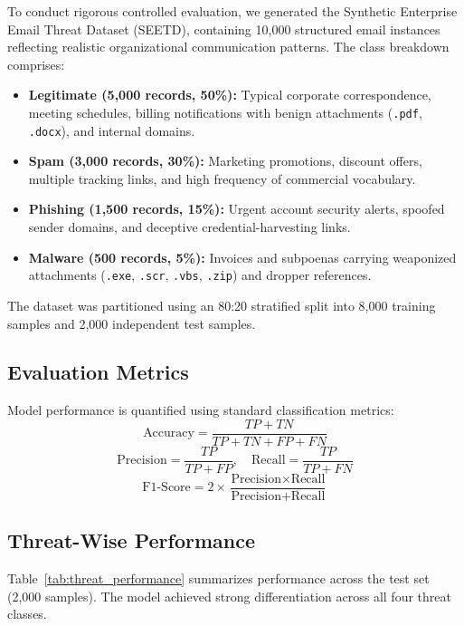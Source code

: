 \documentclass[conference]{IEEEtran}
\begin{document}
To conduct rigorous controlled evaluation, we generated the Synthetic Enterprise Email Threat Dataset (SEETD), containing 10,000 structured email instances reflecting realistic organizational communication patterns. The class breakdown comprises:
\begin{itemize}
    \item \textbf{Legitimate (5,000 records, 50\%):} Typical corporate correspondence, meeting schedules, billing notifications with benign attachments (\texttt{.pdf}, \texttt{.docx}), and internal domains.
    \item \textbf{Spam (3,000 records, 30\%):} Marketing promotions, discount offers, multiple tracking links, and high frequency of commercial vocabulary.
    \item \textbf{Phishing (1,500 records, 15\%):} Urgent account security alerts, spoofed sender domains, and deceptive credential-harvesting links.
    \item \textbf{Malware (500 records, 5\%):} Invoices and subpoenas carrying weaponized attachments (\texttt{.exe}, \texttt{.scr}, \texttt{.vbs}, \texttt{.zip}) and dropper references.
\end{itemize}

The dataset was partitioned using an 80:20 stratified split into 8,000 training samples and 2,000 independent test samples.

\subsection{Evaluation Metrics}
Model performance is quantified using standard classification metrics:
\begin{equation}
    \text{Accuracy} = \frac{TP + TN}{TP + TN + FP + FN}
\end{equation}
\begin{equation}
    \text{Precision} = \frac{TP}{TP + FP}, \quad \text{Recall} = \frac{TP}{TP + FN}
\end{equation}
\begin{equation}
    \text{F1-Score} = 2 \times \frac{\text{Precision} \times \text{Recall}}{\text{Precision} + \text{Recall}}
\end{equation}

\subsection{Threat-Wise Performance}
Table~\ref{tab:threat_performance} summarizes performance across the test set (2,000 samples). The model achieved strong differentiation across all four threat classes.
\end{document}

